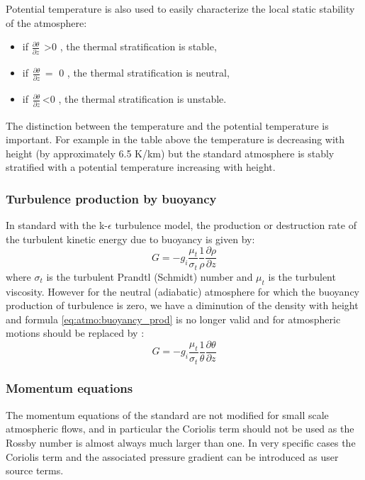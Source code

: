 Potential temperature is also used to easily characterize the local static
stability of the atmosphere:
\begin{itemize}
  \item if $\frac{\partial \theta }{\partial z}_{\, \, \, }$\textgreater 0 , the
    thermal stratification is stable,
  \item if$_{\, \, \, }\frac{\partial \theta }{\partial z}_{\, }=$ 0 , the
    thermal stratification is neutral,
  \item if$_{\, \, \, }\frac{\partial \theta }{\partial z}_{\, }$\textless 0 ,
    the thermal stratification is unstable.
\end{itemize}

The distinction between the temperature and the potential temperature is
important. For example in the table above the temperature is decreasing with
height (by approximately 6.5 K/km) but the standard atmosphere is stably
stratified with a potential temperature increasing with height.


\subsubsection{Turbulence production by buoyancy}
In standard \CS with the k-$\epsilon$ turbulence model, the production or destruction rate of the turbulent kinetic energy due to buoyancy is given by:
\begin{equation}
\label{eq:atmo:buoyancy_prod}
G=-g_{i} \frac{\mu_{t} }{\sigma_{t} }\frac{1}{\rho }\frac{\partial \rho
}{\partial z}
\end{equation}
where $\sigma_{t}$ is the turbulent Prandtl (Schmidt) number and $\mu_{t}$ is the turbulent viscosity.
However for the neutral (adiabatic) atmosphere for which the buoyancy
production of turbulence is zero, we have a diminution of the density with
height and formula \eqref{eq:atmo:buoyancy_prod} is no longer valid and for atmospheric motions should
be replaced by \cite{Stull:1988}:
\begin{equation}
\label{eq:atmo:eq4}
G=-g_{i} \frac{\mu_{t}}{\sigma_{t} }\frac{1}{\theta }\frac{\partial \theta
}{\partial z}
\end{equation}

\subsubsection{ Momentum equations }
The momentum equations of the standard \CS are not
modified for small scale atmospheric flows, and in particular the Coriolis
term should not be used as the Rossby number is almost always much larger
than one. In very specific cases the Coriolis term and the associated
pressure gradient can be introduced as user source terms.

